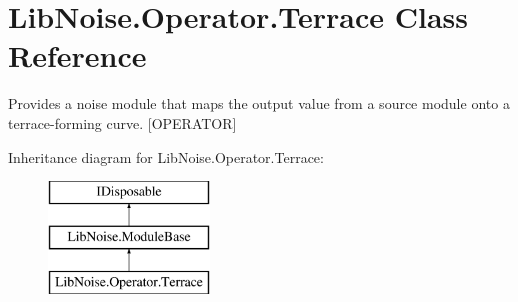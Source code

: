 \hypertarget{class_lib_noise_1_1_operator_1_1_terrace}{}\section{Lib\+Noise.\+Operator.\+Terrace Class Reference}
\label{class_lib_noise_1_1_operator_1_1_terrace}


Provides a noise module that maps the output value from a source module onto a terrace-\/forming curve. \mbox{[}O\+P\+E\+R\+A\+T\+OR\mbox{]}  


Inheritance diagram for Lib\+Noise.\+Operator.\+Terrace\+:\begin{figure}[H]
\begin{center}
\leavevmode
\includegraphics[height=3.000000cm]{class_lib_noise_1_1_operator_1_1_terrace}
\end{center}
\end{figure}
